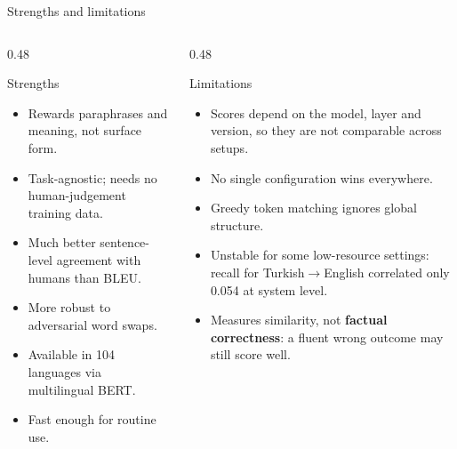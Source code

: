 \documentclass[aspectratio=169,11pt]{beamer}
\begin{document}
\begin{frame}{Strengths and limitations}
  \begin{columns}[T]
    \begin{column}{0.48\textwidth}
      \begin{exampleblock}{Strengths}
        \small
        \begin{itemize}
          \item Rewards paraphrases and meaning, not surface form.
          \item Task-agnostic; needs no human-judgement training data.
          \item Much better sentence-level agreement with humans than BLEU.
          \item More robust to adversarial word swaps.
          \item Available in 104 languages via multilingual BERT.
          \item Fast enough for routine use.
        \end{itemize}
      \end{exampleblock}
    \end{column}
    \begin{column}{0.48\textwidth}
      \begin{alertblock}{Limitations}
        \small
        \begin{itemize}
          \item Scores depend on the model, layer and version, so they are not comparable across setups.
          \item No single configuration wins everywhere.
          \item Greedy token matching ignores global structure.
          \item Unstable for some low-resource settings: recall for Turkish$\to$English correlated only 0.054 at system level.
          \item Measures similarity, not \textbf{factual correctness}: a fluent wrong outcome may still score well.
        \end{itemize}
      \end{alertblock}
    \end{column}
  \end{columns}
\end{frame}
\end{document}
